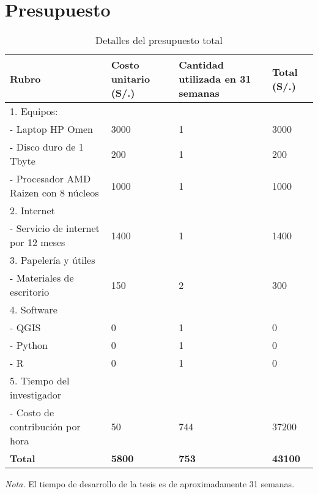 \section{Presupuesto}
\begin{table}[H]
    \centering
    \caption{Detalles del presupuesto total}
    \begin{tabularx}{\textwidth}{XXXX}
        \hline
        \textbf{Rubro} & \textbf{Costo unitario (S/.)} & \textbf{Cantidad utilizada en 31 semanas} & \textbf{Total (S/.)} \\ 
        \hline
        1. Equipos: & & &  \\
        - Laptop HP Omen& 3000 & 1 & 3000 \\
        - Disco duro de 1 Tbyte & 200 & 1 & 200 \\
		- Procesador AMD Raizen con 8 núcleos & 1000 & 1 & 1000 \\
        2. Internet & & &  \\
        - Servicio de internet por 12 meses & 1400 & 1 & 1400 \\
        3. Papelería y útiles & & &  \\
        - Materiales de escritorio & 150 & 2 & 300 \\
        4. Software & & &  \\
        - QGIS & 0 & 1 & 0 \\
        - Python & 0 & 1 & 0 \\
        - R & 0 & 1 & 0  \\
        5. Tiempo del investigador & & & \\
        - Costo de contribución por hora & 50 & 744 & 37200 \\
        \hline
		\textbf{Total} & \textbf{5800} & \textbf{753} & \textbf{43100} \\
		\hline
    \end{tabularx}
    \begin{flushleft}
        \textit{Nota.} El tiempo de desarrollo de la tesis es de aproximadamente 31 semanas.        
        \vspace{-\baselineskip}
    \end{flushleft}
\end{table}
